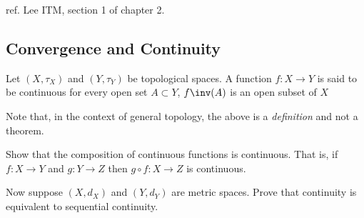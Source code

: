 \documentclass{pset}
\begin{document}
{\tiny ref. Lee ITM, section 1 of chapter 2.}

\subsection{Convergence and Continuity}
\begin{definition}[continuity]
    Let $(X, \tau_X)$ and $(Y, \tau_Y)$ be topological spaces. A function $f\colon X\longrightarrow Y$ is said to be continuous for every open 
    set $A\subset Y$, $f\inv(A)$ is an open subset of $X$
\end{definition}
Note that, in the context of general topology, the above is a \emph{definition} and not a theorem.
\begin{definition}[convergence]
    
\end{definition}
\begin{definition}
    
\end{definition}

\begin{exercise}
Show that the composition of continuous functions is continuous. That is, if $f\colon X\longrightarrow Y$ and 
$g\colon Y\longrightarrow Z$ then $g \circ f\colon X\longrightarrow Z$ is continuous.
\end{exercise}

\begin{exercise}
Now suppose $(X, d_X)$ and $(Y, d_Y)$ are metric spaces. Prove that continuity is equivalent to sequential continuity.
\end{exercise}
\end{document}

